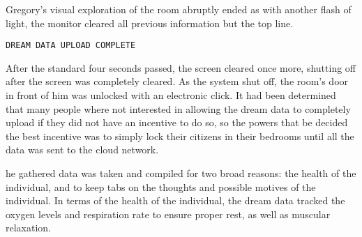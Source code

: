 Gregory’s visual exploration of the room abruptly ended as with another flash of light, the monitor cleared all previous information but the top line.
\begin{center}
\verb|DREAM DATA UPLOAD COMPLETE|
\end{center}
After the standard four seconds passed, the screen cleared once more, shutting off after the screen was completely cleared.
As the system shut off, the room’s door in front of him was unlocked with an electronic click.
It had been determined that many people where not interested in allowing the dream data to completely upload if they did
not have an incentive to do so, so the powers that be decided the best  incentive was to simply lock their citizens in their bedrooms until all the data was sent to the cloud network.

he gathered data was taken and compiled for two broad reasons: the health of the individual, and to keep tabs on the thoughts and possible motives of the individual.
In terms of the health of the individual, the dream data tracked the oxygen levels and respiration rate to ensure proper rest, as well as muscular relaxation.
